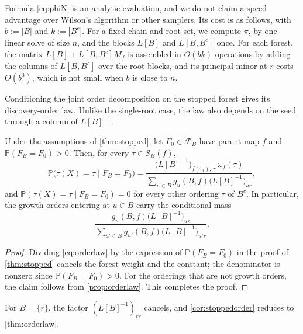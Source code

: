 \documentclass[onefignum,onetabnum,nohypdvips]{siamart250211}
\numberwithin{theorem}{section}
\numberwithin{equation}{section}
\newcommand{\Orders}{\mathcal{S}}
\newcommand{\Fset}{\mathcal{F}}
\newcommand{\pr}{\mathbb{P}}
\begin{document}
\begin{remark}\label{rem:cost}
Formula \eqref{eq:phiN} is an analytic evaluation, and we do not claim a
speed advantage over Wilson's algorithm or other samplers. Its cost is
as follows, with $b:=|B|$ and $k:=|B^c|$. For a fixed chain and root set,
we compute $\pi$, by one linear solve of size $n$, and the blocks
$L[B]$ and $L[B,B^c]$ once. For each forest, the matrix
$L[B]+L[B,B^c]M_f$ is assembled in $O(bk)$ operations by adding the
columns of $L[B,B^c]$ over the root blocks, and its principal minor at
$r$ costs $O(b^3)$, which is not small when $b$ is close to $n$.
\end{remark}

Conditioning the joint order decomposition on the stopped forest
gives its discovery-order law. Unlike the single-root case, the law
also depends on the seed through a column of $L[B]^{-1}$.

\begin{corollary}\label{cor:stoppedorder}
Under the assumptions of \cref{thm:stopped}, let $F_0\in\Fset_B$ have
parent map $f$ and $\pr(F_B=F_0)>0$. Then, for every
$\tau\in\Orders_B(f)$,
\[
\pr\big(\tau(X)=\tau\mid F_B=F_0\big)
=\frac{\big(L[B]^{-1}\big)_{f(\tau_1),\,r}\,\omega_f(\tau)}
{\sum_{u\in B}g_u(B,f)\big(L[B]^{-1}\big)_{ur}},
\]
and $\pr(\tau(X)=\tau\mid F_B=F_0)=0$ for every other ordering $\tau$ of
$B^c$. In particular, the growth orders entering at $u\in B$ carry the
conditional mass
\[
\frac{g_u(B,f)\big(L[B]^{-1}\big)_{ur}}
{\sum_{u'\in B}g_{u'}(B,f)\big(L[B]^{-1}\big)_{u'r}} .
\]
\end{corollary}

\begin{proof}
Dividing \eqref{eq:orderlaw} by the expression of $\pr(F_B=F_0)$ in the
proof of \cref{thm:stopped} cancels the forest weight and the constant;
the denominator is nonzero since $\pr(F_B=F_0)>0$. For the orderings
that are not growth orders, the claim follows from \cref{prop:orderlaw}.
This completes the proof.
\end{proof}

For $B=\{r\}$, the factor $(L[B]^{-1})_{rr}$ cancels, and
\cref{cor:stoppedorder} reduces to \cref{thm:orderlaw}.
\end{document}
